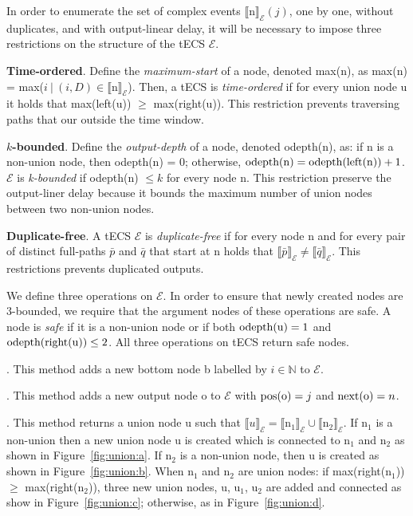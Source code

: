 In order to enumerate the set of complex events ${\llbracket \textrm{n} \rrbracket}_{\mathcal{E}}(j)$, one by one, without duplicates, and with output-linear delay, it will be necessary to impose three restrictions on the structure of the tECS $\mathcal{E}$.

\textbf{Time-ordered}. Define the \emph{maximum-start} of a node, denoted max(\textrm{n}), as max(\textrm{n}) = max(${ i \ | \ (i, D) \in {\llbracket \textrm{n} \rrbracket}_{\mathcal{E}}}$). Then, a tECS is \emph{time-ordered} if for every union node \textrm{u} it holds that max(left(\textrm{u})) $\ge$ max(right(\textrm{u})). This restriction prevents traversing paths that our outside the time window.

\textbf{$k$-bounded}. Define the \emph{output-depth} of a node, denoted odepth(\textrm{n}), as: if \textrm{n} is a non-union node, then odepth(\textrm{n}) = 0; otherwise, $\text{odepth(\textrm{n})} = \text{odepth(left(\textrm{n}))} + 1$. $\mathcal{E}$ is \emph{k-bounded} if odepth(\textrm{n}) $\leq k$ for every node \textrm{n}. This restriction preserve the output-liner delay because it bounds the maximum number of union nodes between two non-union nodes.

\textbf{Duplicate-free}. A tECS $\mathcal{E}$ is \emph{duplicate-free} if for every node \textrm{n} and for every pair of distinct full-paths $\bar{p}$ and $\bar{q}$ that start at \textrm{n} holds that ${\llbracket \bar{p} \rrbracket}_{\mathcal{E}} \ne {\llbracket \bar{q} \rrbracket}_{\mathcal{E}}$. This restrictions prevents duplicated outputs.

We define three operations on $\mathcal{E}$. In order to ensure that newly created nodes are $3$-bounded, we require that the argument nodes of these operations are safe. A node is \emph{safe} if it is a non-union node or if both $\text{odepth(\textrm{u})} = 1$ and $\text{odepth(right(\textrm{u}))} \le 2$. All three operations on tECS return safe nodes.

. This method adds a new bottom node \textrm{b} labelled by $i \in \mathbb{N}$ to $\mathcal{E}$.

. This method adds a new output node \textrm{o} to $\mathcal{E}$ with $\text{pos(\textrm{o})} = j$ and $\text{next(\textrm{o})} = n$.

. This method returns a union node \textrm{u} such that ${\llbracket u \rrbracket}_{\mathcal{E}} = {\llbracket \textrm{n}_{1} \rrbracket}_{\mathcal{E}} \cup {\llbracket \textrm{n}_{2} \rrbracket}_{\mathcal{E}}$. If $\textrm{n}_{1}$ is a non-union then a new union node \textrm{u} is created which is connected to $\textrm{n}_{1}$ and $\textrm{n}_{2}$ as shown in Figure~\ref{fig:union:a}. If $\textrm{n}_{2}$ is a non-union node, then \textrm{u} is created as shown in Figure~\ref{fig:union:b}. When $\textrm{n}_{1}$ and $\textrm{n}_{2}$ are union nodes: if max(right($\textrm{n}_{1}$)) $\ge$ max(right($\textrm{n}_{2}$)), three new union nodes, \textrm{u}, $\textrm{u}_{1}$, $\textrm{u}_{2}$ are added and connected as show in Figure~\ref{fig:union:c}; otherwise, as in Figure~\ref{fig:union:d}.

